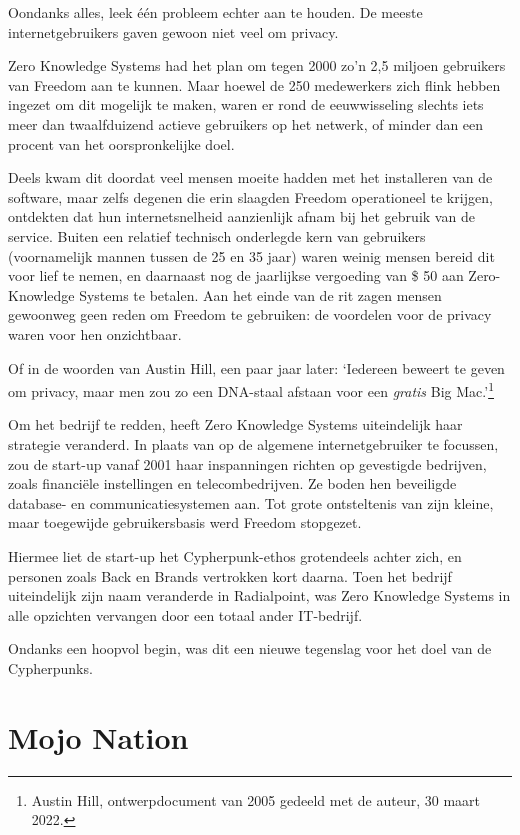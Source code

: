 \documentclass[
  a5paper,
  smalldemyvopaper,11pt,twoside,onecolumn,openright,extrafontsizes,
hidelinks]{memoir}
\begin{document}
Oondanks alles, leek één probleem echter aan te houden. De meeste
internetgebruikers gaven gewoon niet veel om privacy.

Zero Knowledge Systems had het plan om tegen 2000 zo'n 2,5 miljoen
gebruikers van Freedom aan te kunnen. Maar hoewel de 250 medewerkers
zich flink hebben ingezet om dit mogelijk te maken, waren er rond de
eeuwwisseling slechts iets meer dan twaalfduizend actieve gebruikers op
het netwerk, of minder dan een procent van het oorspronkelijke doel.

Deels kwam dit doordat veel mensen moeite hadden met het installeren van
de software, maar zelfs degenen die erin slaagden Freedom operationeel
te krijgen, ontdekten dat hun internetsnelheid aanzienlijk afnam bij het
gebruik van de service. Buiten een relatief technisch onderlegde kern
van gebruikers (voornamelijk mannen tussen de 25 en 35 jaar) waren
weinig mensen bereid dit voor lief te nemen, en daarnaast nog de
jaarlijkse vergoeding van \$ 50 aan Zero-Knowledge Systems te betalen.
Aan het einde van de rit zagen mensen gewoonweg geen reden om Freedom te
gebruiken: de voordelen voor de privacy waren voor hen onzichtbaar.

Of in de woorden van Austin Hill, een paar jaar later: `Iedereen beweert
te geven om privacy, maar men zou zo een DNA-staal afstaan voor een
\emph{gratis} Big Mac.'\footnote{Austin Hill, ontwerpdocument van 2005
  gedeeld met de auteur, 30 maart 2022.}

Om het bedrijf te redden, heeft Zero Knowledge Systems uiteindelijk haar
strategie veranderd. In plaats van op de algemene internetgebruiker te
focussen, zou de start-up vanaf 2001 haar inspanningen richten op
gevestigde bedrijven, zoals financiële instellingen en telecombedrijven.
Ze boden hen beveiligde database- en communicatiesystemen aan. Tot grote
ontsteltenis van zijn kleine, maar toegewijde gebruikersbasis werd
Freedom stopgezet.

Hiermee liet de start-up het Cypherpunk-ethos grotendeels achter zich,
en personen zoals Back en Brands vertrokken kort daarna. Toen het
bedrijf uiteindelijk zijn naam veranderde in Radialpoint, was Zero
Knowledge Systems in alle opzichten vervangen door een totaal ander
IT-bedrijf.

Ondanks een hoopvol begin, was dit een nieuwe tegenslag voor het doel
van de Cypherpunks.

\section{Mojo Nation}\label{mojo-nation}
\end{document}
